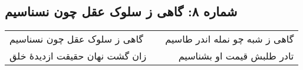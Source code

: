 \begin{center}
\section*{شماره ۸: گاهی ز سلوک عقل چون نسناسیم}
\label{sec:008}
\begin{longtable}{l p{0.5cm} r}
گاهی ز سلوک عقل چون نسناسیم
&&
گاهی ز شبه چو نمله اندر طاسیم
\\
زان گشت نهان حقیقت ازدیدهٔ خلق
&&
تادر طلبش قیمت او بشناسیم
\\
\end{longtable}
\end{center}
